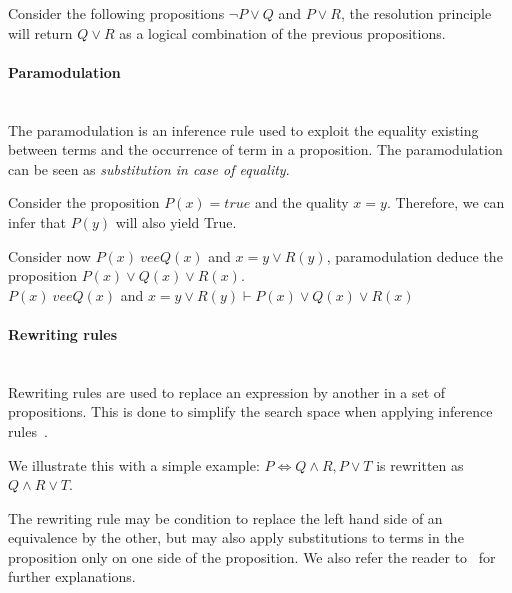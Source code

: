 Consider the following propositions $\neg P \vee Q$ and $P \vee R$, the resolution principle will return $Q \vee R$ as a logical combination of the previous propositions.

\paragraph{Paramodulation}\textbf{\\}
The paramodulation is an inference rule used to exploit the equality existing between terms and the occurrence of term in a proposition. The paramodulation can be seen as \textit{substitution in case of equality}.

Consider the proposition $P(x) = true$ and the quality $x=y$. Therefore, we can infer that $P(y)$ will also yield True.

Consider now $P(x) \ vee Q(x)$ and $x = y \vee R(y)$, paramodulation deduce the proposition $P(x) \vee Q(x) \vee R(x)$.\\
$P(x) \ vee Q(x)$ and $x = y \vee R(y) \vdash P(x) \vee Q(x) \vee R(x)$

\paragraph{Rewriting rules}\textbf{\\}
Rewriting rules are used to replace an expression by another in a set of propositions.
This is done to simplify the search space when applying inference rules~\cite{snark-Stickel2000}.

We illustrate this with a simple example: $P \Leftrightarrow Q \wedge R, P \vee T$ is rewritten as $Q \wedge R \vee T$. 

The rewriting rule may be condition to replace the left hand side of an equivalence by the other, but may also apply substitutions to terms in the proposition only on one side of the proposition.
We also refer the reader to~\cite{snark-Stickel2000,symbolic-proof} for further explanations.
